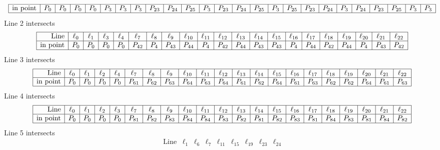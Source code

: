 \documentclass{article}
\begin{document}
{$$\begin{array}{|r*{24}{|c}|}
\hline
\mbox{in point}  & P_{0} & P_{0} & P_{0} & P_{0} & P_{3} & P_{3} & P_{3} & P_{23} & P_{24} & P_{25} & P_{3} & P_{23} & P_{24} & P_{25} & P_{3} & P_{25} & P_{23} & P_{24} & P_{3} & P_{24} & P_{23} & P_{25} & P_{3} & P_{3}\\
\hline
\end{array}
$$
Line 2 intersects 
$$
\begin{array}{|r*{20}{|c}|}
\hline
\mbox{Line}  & \ell_{0} & \ell_{1} & \ell_{3} & \ell_{4} & \ell_{7} & \ell_{8} & \ell_{9} & \ell_{10} & \ell_{11} & \ell_{12} & \ell_{13} & \ell_{14} & \ell_{15} & \ell_{16} & \ell_{17} & \ell_{18} & \ell_{19} & \ell_{20} & \ell_{21} & \ell_{22}\\
\hline
\mbox{in point}  & P_{0} & P_{0} & P_{0} & P_{0} & P_{42} & P_{4} & P_{43} & P_{44} & P_{4} & P_{42} & P_{44} & P_{43} & P_{43} & P_{4} & P_{44} & P_{42} & P_{44} & P_{4} & P_{43} & P_{42}\\
\hline
\end{array}
$$
Line 3 intersects 
$$
\begin{array}{|r*{20}{|c}|}
\hline
\mbox{Line}  & \ell_{0} & \ell_{1} & \ell_{2} & \ell_{4} & \ell_{7} & \ell_{8} & \ell_{9} & \ell_{10} & \ell_{11} & \ell_{12} & \ell_{13} & \ell_{14} & \ell_{15} & \ell_{16} & \ell_{17} & \ell_{18} & \ell_{19} & \ell_{20} & \ell_{21} & \ell_{22}\\
\hline
\mbox{in point}  & P_{0} & P_{0} & P_{0} & P_{0} & P_{61} & P_{62} & P_{63} & P_{64} & P_{63} & P_{64} & P_{61} & P_{62} & P_{64} & P_{61} & P_{63} & P_{62} & P_{62} & P_{64} & P_{61} & P_{63}\\
\hline
\end{array}
$$
Line 4 intersects 
$$
\begin{array}{|r*{20}{|c}|}
\hline
\mbox{Line}  & \ell_{0} & \ell_{1} & \ell_{2} & \ell_{3} & \ell_{7} & \ell_{8} & \ell_{9} & \ell_{10} & \ell_{11} & \ell_{12} & \ell_{13} & \ell_{14} & \ell_{15} & \ell_{16} & \ell_{17} & \ell_{18} & \ell_{19} & \ell_{20} & \ell_{21} & \ell_{22}\\
\hline
\mbox{in point}  & P_{0} & P_{0} & P_{0} & P_{0} & P_{81} & P_{82} & P_{83} & P_{84} & P_{84} & P_{83} & P_{82} & P_{81} & P_{82} & P_{83} & P_{81} & P_{84} & P_{83} & P_{81} & P_{84} & P_{82}\\
\hline
\end{array}
$$
Line 5 intersects 
$$
\begin{array}{|r*{8}{|c}|}
\hline
\mbox{Line}  & \ell_{1} & \ell_{6} & \ell_{7} & \ell_{11} & \ell_{15} & \ell_{19} & \ell_{23} & \ell_{24}\\

\end{array}$$}
\end{document}
